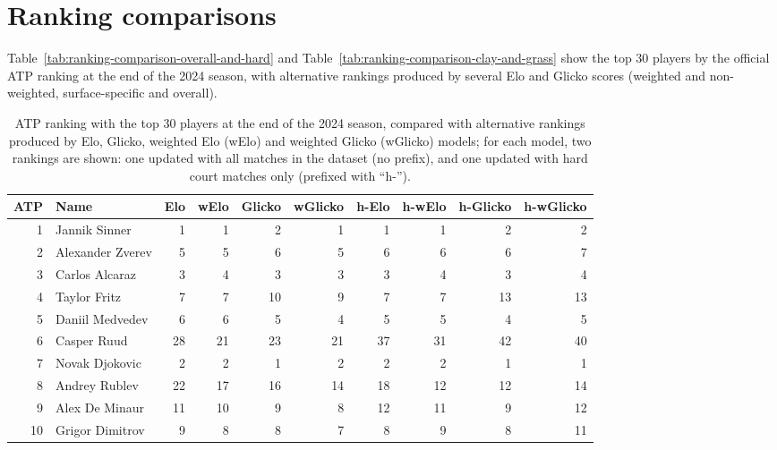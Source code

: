 \pagebreak


\printbibliography[heading=bibintoc]


\pagebreak


\appendix

\section{Ranking comparisons}
\label{sec:ranking-comparisons}

Table~\ref{tab:ranking-comparison-overall-and-hard} and
Table~\ref{tab:ranking-comparison-clay-and-grass} show the top 30 players by the official
ATP ranking at the end of the 2024 season, with alternative rankings
produced by several Elo and Glicko scores (weighted and non-weighted, surface-specific and
overall).

\begin{table}[ht!]
  \centering
  \small
  \caption{ATP ranking with the top 30 players at the end of the 2024 season, compared with
    alternative rankings produced by Elo, Glicko, weighted Elo (wElo) and weighted Glicko (wGlicko)
    models; for each model, two rankings are shown: one updated with all matches in the dataset
    (no prefix), and one updated with hard court matches only (prefixed with ``h-'').}
  \vspace{1em}
  \begin{tabular}{rlrrrrrrrr}
    \toprule
    \textbf{ATP} & \textbf{Name} & \textbf{Elo} & \textbf{wElo} & \textbf{Glicko} & \textbf{wGlicko} & \textbf{h-Elo} & \textbf{h-wElo} & \textbf{h-Glicko} & \textbf{h-wGlicko} \\
    \midrule
     1 & Jannik Sinner & 1 & 1 & 2 & 1 & 1 & 1 & 2 & 2 \\
     2 & Alexander Zverev & 5 & 5 & 6 & 5 & 6 & 6 & 6 & 7 \\
     3 & Carlos Alcaraz & 3 & 4 & 3 & 3 & 3 & 4 & 3 & 4 \\
     4 & Taylor Fritz & 7 & 7 & 10 & 9 & 7 & 7 & 13 & 13 \\
     5 & Daniil Medvedev & 6 & 6 & 5 & 4 & 5 & 5 & 4 & 5 \\
     6 & Casper Ruud & 28 & 21 & 23 & 21 & 37 & 31 & 42 & 40 \\
     7 & Novak Djokovic & 2 & 2 & 1 & 2 & 2 & 2 & 1 & 1 \\
     8 & Andrey Rublev & 22 & 17 & 16 & 14 & 18 & 12 & 12 & 14 \\
     9 & Alex De Minaur & 11 & 10 & 9 & 8 & 12 & 11 & 9 & 12 \\
    10 & Grigor Dimitrov & 9 & 8 & 8 & 7 & 8 & 9 & 8 & 11 \\

\end{tabular}
\end{table}
